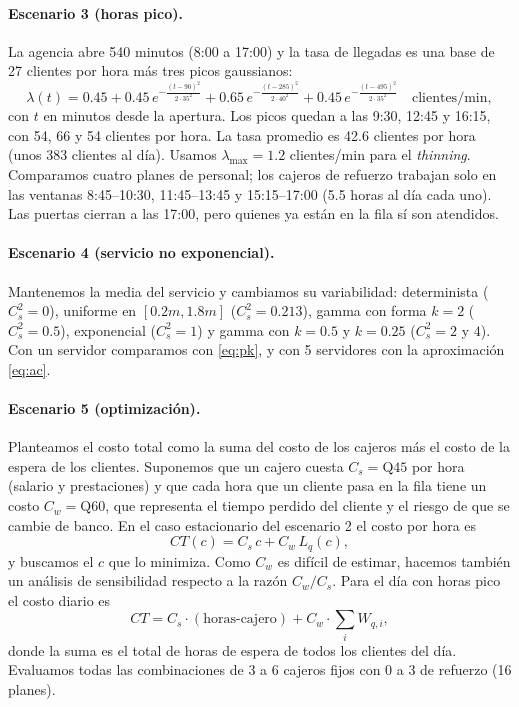 \documentclass[11pt,letterpaper]{article}
\begin{document}
\paragraph{Escenario 3 (horas pico).} La agencia abre 540 minutos (8:00 a 17:00) y la tasa
de llegadas es una base de 27 clientes por hora más tres picos gaussianos:
\begin{equation}
  \lambda(t) = 0.45 + 0.45\,e^{-\frac{(t-90)^2}{2\cdot 35^2}}
                    + 0.65\,e^{-\frac{(t-285)^2}{2\cdot 40^2}}
                    + 0.45\,e^{-\frac{(t-495)^2}{2\cdot 35^2}}
  \quad \text{clientes/min},
\end{equation}
con $t$ en minutos desde la apertura. Los picos quedan a las 9:30, 12:45 y 16:15, con
54, 66 y 54 clientes por hora. La tasa promedio es 42.6 clientes por hora (unos 383
clientes al día). Usamos $\lambda_{\max} = 1.2$ clientes/min para el \emph{thinning}.
Comparamos cuatro planes de personal; los cajeros de refuerzo trabajan solo en las
ventanas 8:45--10:30, 11:45--13:45 y 15:15--17:00 (5.5 horas al día cada uno). Las
puertas cierran a las 17:00, pero quienes ya están en la fila sí son atendidos.

\paragraph{Escenario 4 (servicio no exponencial).} Mantenemos la media del servicio y
cambiamos su variabilidad: determinista ($C_s^2=0$), uniforme en $[0.2m, 1.8m]$
($C_s^2=0.213$), gamma con forma $k=2$ ($C_s^2=0.5$), exponencial ($C_s^2=1$) y gamma con
$k=0.5$ y $k=0.25$ ($C_s^2 = 2$ y $4$). Con un servidor comparamos con \eqref{eq:pk}, y con 5
servidores con la aproximación \eqref{eq:ac}.

\paragraph{Escenario 5 (optimización).} Planteamos el costo total como la suma del costo
de los cajeros más el costo de la espera de los clientes. Suponemos que un cajero cuesta
$C_s = \text{Q}45$ por hora (salario y prestaciones) y que cada hora que un cliente pasa en
la fila tiene un costo $C_w = \text{Q}60$, que representa el tiempo perdido del cliente y
el riesgo de que se cambie de banco. En el caso estacionario del escenario 2 el costo por
hora es
\begin{equation}
  CT(c) = C_s\, c + C_w\, L_q(c),
\end{equation}
y buscamos el $c$ que lo minimiza. Como $C_w$ es difícil de estimar, hacemos también un
análisis de sensibilidad respecto a la razón $C_w/C_s$. Para el día con horas pico el costo
diario es
\begin{equation}
  CT = C_s \cdot (\text{horas-cajero}) + C_w \cdot \sum_i W_{q,i},
\end{equation}
donde la suma es el total de horas de espera de todos los clientes del día. Evaluamos
todas las combinaciones de 3 a 6 cajeros fijos con 0 a 3 de refuerzo (16 planes).
\end{document}

